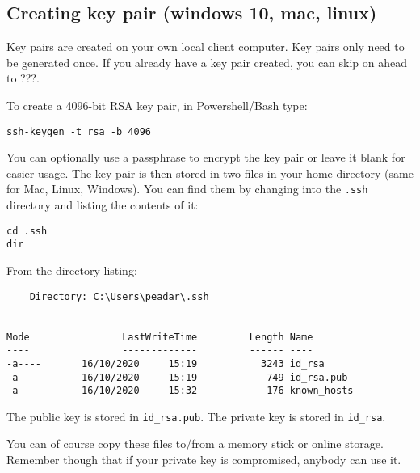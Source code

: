 \documentclass{pgnotes}
\begin{document}
\subsection{Creating key pair (windows 10, mac, linux)}
\label{sec:creating-key-pair}

Key pairs are created on your own local client computer.
Key pairs only need to be generated once.
If you already have a key pair created, you can skip on ahead to ???.

To create a 4096-bit RSA key pair, in Powershell/Bash type: 

\begin{verbatim}
ssh-keygen -t rsa -b 4096
\end{verbatim}

You can optionally use a passphrase to encrypt the key pair or leave it blank for easier usage.
The key pair is then stored in two files in your home directory (same for Mac, Linux, Windows).
You can find them by changing into the \texttt{.ssh} directory and listing the contents of it:
\begin{verbatim}
cd .ssh
dir
\end{verbatim}
From the directory listing:
\begin{verbatim}
    Directory: C:\Users\peadar\.ssh


Mode                LastWriteTime         Length Name
----                -------------         ------ ----
-a----       16/10/2020     15:19           3243 id_rsa
-a----       16/10/2020     15:19            749 id_rsa.pub
-a----       16/10/2020     15:32            176 known_hosts
\end{verbatim}
The public key is stored in \texttt{id\_rsa.pub}.
The private key is stored in \texttt{id\_rsa}.

You can of course copy these files to/from a memory stick or online storage.
Remember though that if your private key is compromised, anybody can use it.



\end{document}
